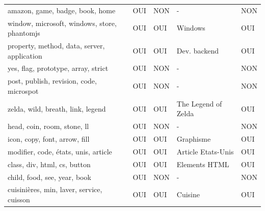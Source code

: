 \begin{longtable}{lllll}
\scriptsize amazon, game, badge, book, home                    & \cellcolor[HTML]{9AFF99}OUI & \cellcolor[HTML]{FFCCC9}NON & -                         & \cellcolor[HTML]{FFCCC9}NON \\
\scriptsize window, microsoft, windows, store, phantomjs       & \cellcolor[HTML]{9AFF99}OUI & \cellcolor[HTML]{9AFF99}OUI & Windows                   & \cellcolor[HTML]{9AFF99}OUI \\
\scriptsize property, method, data, server, application        & \cellcolor[HTML]{9AFF99}OUI & \cellcolor[HTML]{9AFF99}OUI & Dev. backend              & \cellcolor[HTML]{9AFF99}OUI \\
\scriptsize yes, flag, prototype, array, strict                & \cellcolor[HTML]{9AFF99}OUI & \cellcolor[HTML]{FFCCC9}NON & -                         & \cellcolor[HTML]{FFCCC9}NON \\
\scriptsize post, publish, revision, code, microspot           & \cellcolor[HTML]{9AFF99}OUI & \cellcolor[HTML]{FFCCC9}NON & -                         & \cellcolor[HTML]{FFCCC9}NON \\
\scriptsize zelda, wild, breath, link, legend                  & \cellcolor[HTML]{9AFF99}OUI & \cellcolor[HTML]{9AFF99}OUI & The Legend of Zelda       & \cellcolor[HTML]{9AFF99}OUI \\
\scriptsize head, coin, room, stone, ll                        & \cellcolor[HTML]{9AFF99}OUI & \cellcolor[HTML]{FFCCC9}NON & -                         & \cellcolor[HTML]{FFCCC9}NON \\
\scriptsize icon, copy, font, arrow, fill                      & \cellcolor[HTML]{9AFF99}OUI & \cellcolor[HTML]{9AFF99}OUI & Graphisme                 & \cellcolor[HTML]{9AFF99}OUI \\
\scriptsize modifier, code, états, unis, article               & \cellcolor[HTML]{9AFF99}OUI & \cellcolor[HTML]{9AFF99}OUI & Article Etats-Unis        & \cellcolor[HTML]{9AFF99}OUI \\
\scriptsize class, div, html, cs, button                       & \cellcolor[HTML]{9AFF99}OUI & \cellcolor[HTML]{9AFF99}OUI & Elements HTML             & \cellcolor[HTML]{9AFF99}OUI \\
\scriptsize child, food, see, year, book                       & \cellcolor[HTML]{9AFF99}OUI & \cellcolor[HTML]{FFCCC9}NON & -                         & \cellcolor[HTML]{FFCCC9}NON \\
\scriptsize cuisinières, min, laver, service, cuisson          & \cellcolor[HTML]{9AFF99}OUI & \cellcolor[HTML]{9AFF99}OUI & Cuisine                   & \cellcolor[HTML]{9AFF99}OUI \\

\end{longtable}
